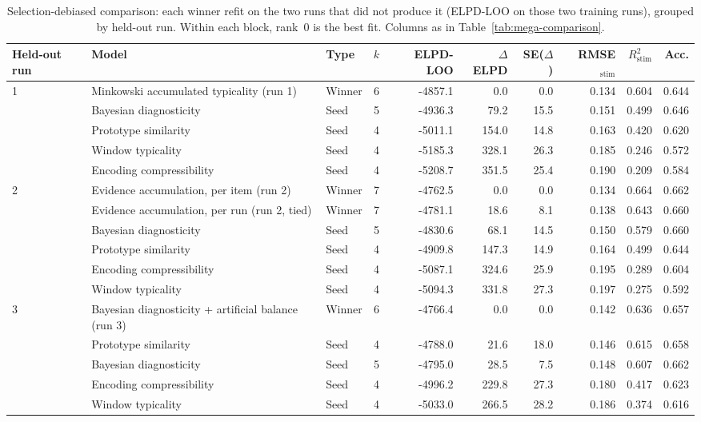 \begin{table}[ht]
\centering
\caption{Selection-debiased comparison: each winner refit on the two runs that did not produce it (ELPD-LOO on those two training runs), grouped by held-out run. Within each block, rank~0 is the best fit. Columns as in Table~\ref{tab:mega-comparison}.} 
\label{tab:heldout-comparison}
\begin{tabular}{lllrrrrrrr}
  \toprule
Held-out run & Model & Type & $k$ & ELPD-LOO & $\Delta$ELPD & SE($\Delta$) & RMSE$_{\mathrm{stim}}$ & $R^2_{\mathrm{stim}}$ & Acc. \\ 
  \midrule
1 & Minkowski accumulated typicality (run 1) & Winner & 6 & -4857.1 & 0.0 & 0.0 & 0.134 & 0.604 & 0.644 \\ 
   & Bayesian diagnosticity & Seed & 5 & -4936.3 & 79.2 & 15.5 & 0.151 & 0.499 & 0.646 \\ 
   & Prototype similarity & Seed & 4 & -5011.1 & 154.0 & 14.8 & 0.163 & 0.420 & 0.620 \\ 
   & Window typicality & Seed & 4 & -5185.3 & 328.1 & 26.3 & 0.185 & 0.246 & 0.572 \\ 
   & Encoding compressibility & Seed & 4 & -5208.7 & 351.5 & 25.4 & 0.190 & 0.209 & 0.584 \\ 
  2 & Evidence accumulation, per item (run 2) & Winner & 7 & -4762.5 & 0.0 & 0.0 & 0.134 & 0.664 & 0.662 \\ 
   & Evidence accumulation, per run (run 2, tied) & Winner & 7 & -4781.1 & 18.6 & 8.1 & 0.138 & 0.643 & 0.660 \\ 
   & Bayesian diagnosticity & Seed & 5 & -4830.6 & 68.1 & 14.5 & 0.150 & 0.579 & 0.660 \\ 
   & Prototype similarity & Seed & 4 & -4909.8 & 147.3 & 14.9 & 0.164 & 0.499 & 0.644 \\ 
   & Encoding compressibility & Seed & 4 & -5087.1 & 324.6 & 25.9 & 0.195 & 0.289 & 0.604 \\ 
   & Window typicality & Seed & 4 & -5094.3 & 331.8 & 27.3 & 0.197 & 0.275 & 0.592 \\ 
  3 & Bayesian diagnosticity + artificial balance (run 3) & Winner & 6 & -4766.4 & 0.0 & 0.0 & 0.142 & 0.636 & 0.657 \\ 
   & Prototype similarity & Seed & 4 & -4788.0 & 21.6 & 18.0 & 0.146 & 0.615 & 0.658 \\ 
   & Bayesian diagnosticity & Seed & 5 & -4795.0 & 28.5 & 7.5 & 0.148 & 0.607 & 0.662 \\ 
   & Encoding compressibility & Seed & 4 & -4996.2 & 229.8 & 27.3 & 0.180 & 0.417 & 0.623 \\ 
   & Window typicality & Seed & 4 & -5033.0 & 266.5 & 28.2 & 0.186 & 0.374 & 0.616 \\ 
   \bottomrule
\end{tabular}
\end{table}

